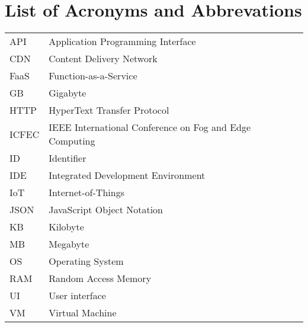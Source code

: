 \chapter*{List of Acronyms and Abbrevations}
\begin{table}[H]
\begin{tabular}{p{2cm}l}
API    & Application Programming Interface                         \\[5pt]
CDN    & Content Delivery Network                                  \\[5pt]
FaaS   & Function-as-a-Service                                     \\[5pt]
GB     & Gigabyte                                                  \\[5pt]
HTTP   & HyperText Transfer Protocol                               \\[5pt]
ICFEC  & IEEE International Conference on Fog and Edge Computing   \\[5pt]
ID     & Identifier                                                \\[5pt]
IDE    & Integrated Development Environment                        \\[5pt]
IoT    & Internet-of-Things                                        \\[5pt]
JSON   & JavaScript Object Notation                                \\[5pt]
KB     & Kilobyte                                                  \\[5pt]
MB     & Megabyte                                                  \\[5pt]
OS     & Operating System                                          \\[5pt]
RAM    & Random Access Memory                                      \\[5pt]
UI     & User interface                                            \\[5pt]
VM     & Virtual Machine                                           \\[5pt]
\end{tabular}
\end{table}
